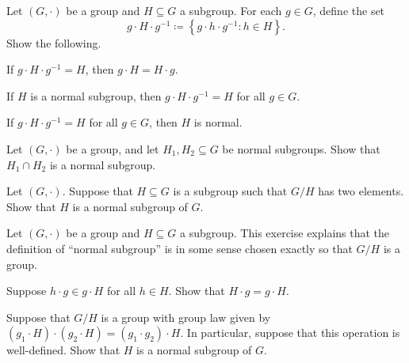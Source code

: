 \documentclass[../main.tex]{subfiles}
\begin{document}
\begin{homework}
    Let $(G,\cdot)$ be a group and $H\subseteq G$ a subgroup. For each $g\in G$, define the set
    \[g\cdot H\cdot g^{-1}\coloneqq\left\{g\cdot h\cdot g^{-1}:h\in H\right\}.\]
    Show the following.
    \begin{listalph}
        \item If $g\cdot H\cdot g^{-1}=H$, then $g\cdot H=H\cdot g$.
        \item If $H$ is a normal subgroup, then $g\cdot H\cdot g^{-1}=H$ for all $g\in G$.
        \item If $g\cdot H\cdot g^{-1}=H$ for all $g\in G$, then $H$ is normal.
    \end{listalph}
\end{homework}

\begin{homework}
    Let $(G,\cdot)$ be a group, and let $H_1,H_2\subseteq G$ be normal subgroups. Show that $H_1\cap H_2$ is a normal subgroup.
\end{homework}

\begin{homework}
    Let $(G,\cdot)$. Suppose that $H\subseteq G$ is a subgroup such that $G/H$ has two elements. Show that $H$ is a normal subgroup of $G$.
\end{homework}

\begin{homework}
    Let $(G,\cdot)$ be a group and $H\subseteq G$ a subgroup. This exercise explains that the definition of ``normal subgroup'' is in some sense chosen exactly so that $G/H$ is a group.
    \begin{listalph}
        \item Suppose $h\cdot g\in g\cdot H$ for all $h\in H$. Show that $H\cdot g=g\cdot H$.
        \item Suppose that $G/H$ is a group with group law given by $(g_1\cdot H)\cdot(g_2\cdot H)=(g_1\cdot g_2)\cdot H$. In particular, suppose that this operation is well-defined. Show that $H$ is a normal subgroup of $G$.
    \end{listalph}
\end{homework}
\end{document}
